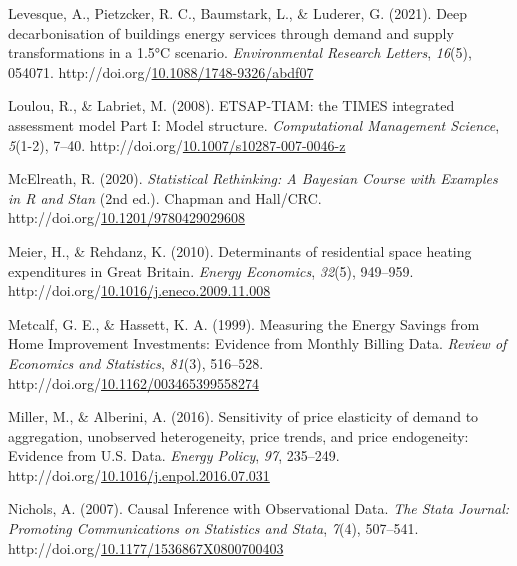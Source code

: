 \documentclass[12pt,twoside]{reedthesis}
\newlength{\cslhangindent}
\newenvironment{CSLReferences}[2] %
 {%
  \setlength{\parindent}{0pt}
  \ifodd #1 \everypar{\setlength{\hangindent}{\cslhangindent}}\ignorespaces\fi
  \ifnum #2 > 0
  \setlength{\parskip}{#2\baselineskip}
  \fi
 }%
 {}
\begin{document}
\begin{CSLReferences}{1}{0}
\leavevmode{}%
Levesque, A., Pietzcker, R. C., Baumstark, L., \& Luderer, G. (2021). Deep decarbonisation of buildings energy services through demand and supply transformations in a 1.5°C scenario. \emph{Environmental Research Letters}, \emph{16}(5), 054071. http://doi.org/\href{https://doi.org/10.1088/1748-9326/abdf07}{10.1088/1748-9326/abdf07}

\leavevmode{}%
Loulou, R., \& Labriet, M. (2008). ETSAP-TIAM: the TIMES integrated assessment model Part I: Model structure. \emph{Computational Management Science}, \emph{5}(1-2), 7--40. http://doi.org/\href{https://doi.org/10.1007/s10287-007-0046-z}{10.1007/s10287-007-0046-z}

\leavevmode{}%
McElreath, R. (2020). \emph{Statistical Rethinking: A Bayesian Course with Examples in R and Stan} (2nd ed.). Chapman and Hall/CRC. http://doi.org/\href{https://doi.org/10.1201/9780429029608}{10.1201/9780429029608}

\leavevmode{}%
Meier, H., \& Rehdanz, K. (2010). Determinants of residential space heating expenditures in Great Britain. \emph{Energy Economics}, \emph{32}(5), 949--959. http://doi.org/\href{https://doi.org/10.1016/j.eneco.2009.11.008}{10.1016/j.eneco.2009.11.008}

\leavevmode{}%
Metcalf, G. E., \& Hassett, K. A. (1999). Measuring the Energy Savings from Home Improvement Investments: Evidence from Monthly Billing Data. \emph{Review of Economics and Statistics}, \emph{81}(3), 516--528. http://doi.org/\href{https://doi.org/10.1162/003465399558274}{10.1162/003465399558274}

\leavevmode{}%
Miller, M., \& Alberini, A. (2016). Sensitivity of price elasticity of demand to aggregation, unobserved heterogeneity, price trends, and price endogeneity: Evidence from U.S. Data. \emph{Energy Policy}, \emph{97}, 235--249. http://doi.org/\href{https://doi.org/10.1016/j.enpol.2016.07.031}{10.1016/j.enpol.2016.07.031}

\leavevmode{}%
Nichols, A. (2007). Causal Inference with Observational Data. \emph{The Stata Journal: Promoting Communications on Statistics and Stata}, \emph{7}(4), 507--541. http://doi.org/\href{https://doi.org/10.1177/1536867X0800700403}{10.1177/1536867X0800700403}


\end{CSLReferences}
\end{document}
